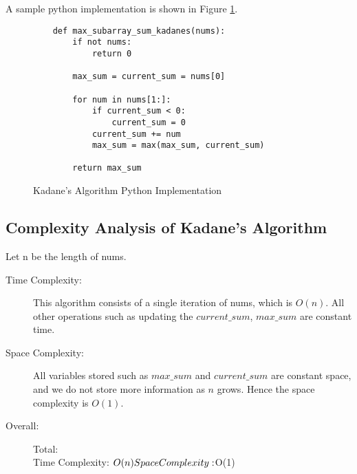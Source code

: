 A sample python implementation is shown in Figure \ref{fig:kadanes}.

\begin{figure}[H]
    \centering
    \begin{lstlisting}
    def max_subarray_sum_kadanes(nums):
        if not nums:
            return 0
    
        max_sum = current_sum = nums[0]
    
        for num in nums[1:]:
            if current_sum < 0:
                current_sum = 0
            current_sum += num
            max_sum = max(max_sum, current_sum)
    
        return max_sum
    \end{lstlisting}
    \caption{Kadane's Algorithm Python Implementation}
    \label{fig:kadanes}
\end{figure}



\subsection{Complexity Analysis of Kadane's Algorithm}
Let n be the length of nums.
\begin{description}
    \item[Time Complexity:]
        This algorithm consists of a single iteration of nums, which is $O(n)$.
        All other operations such as updating the $current\_sum$, $max\_sum$ are constant time.
        
    \item[Space Complexity:] 
        All variables stored such as $max\_sum$ and $current\_sum$ are constant space,
        and we do not store more information as $n$ grows. Hence the space complexity is $O(1)$.

        
    \item[Overall:] Total:\\
        Time Complexity: $O(n)\\
        Space Complexity: $O(1)
    
\end{description}
